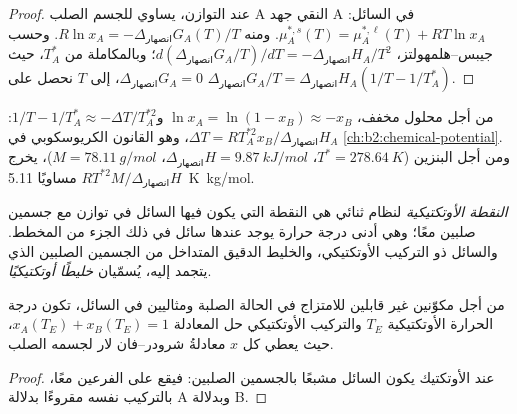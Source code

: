 \begin{proof}
عند التوازن، يساوي  للجسم الصلب A النقي جهد A في
السائل: $\mu_A^{*,s}(T) = \mu_A^{*,\ell}(T) + RT\ln x_A$. ومنه $R\ln x_A =
-\Delta_{\text{انصهار}}G_A(T)/T$. وحسب جيبس--هلمهولتز، $d(\Delta_{\text{انصهار}}G_A/T)/
dT = -\Delta_{\text{انصهار}}H_A/T^2$؛ وبالمكاملة من $T_A^*$، حيث
$\Delta_{\text{انصهار}}G_A = 0$، إلى $T$ نحصل على $\Delta_{\text{انصهار}}G_A/T =
\Delta_{\text{انصهار}}H_A(1/T - 1/T_A^*)$.
\end{proof}

من أجل محلول مخفف، $\ln x_A = \ln(1 - x_B) \approx -x_B$ و$1/T -
1/T_A^* \approx -\Delta T/T_A^{*2}$: $\Delta T = RT_A^{*2}x_B/\Delta_{\text{انصهار}}H_A$،
وهو القانون الكريوسكوبي في \cref{ch:b2:chemical-potential}. ومن أجل البنزين ($T^* =
\qty{278.64}{K}$، $\Delta_{\text{انصهار}}H = \qty{9.87}{kJ/mol}$، $M =
\qty{78.11}{g/mol}$)، يخرج  $RT^{*2}M/\Delta_{\text{انصهار}}H$
مساويًا \qty{5.11}{K.kg/mol}.

\begin{definition}[الأوتكتيك]\label{def:b2:solid-liquid-diagrams:eutectic}
\emph{النقطة الأوتكتيكية} لنظام ثنائي هي
النقطة التي يكون فيها السائل في توازن مع جسمين صلبين معًا؛ وهي
أدنى درجة حرارة يوجد عندها سائل في ذلك الجزء من المخطط. والسائل
ذو التركيب الأوتكتيكي، والخليط الدقيق المتداخل من الجسمين
الصلبين الذي يتجمد إليه، يُسمّيان \emph{خليطًا
أوتكتيكيًا}.
\end{definition}

\begin{corollary}\label{cor:b2:solid-liquid-diagrams:eutectic}
من أجل مكوّنين غير قابلين للامتزاج في الحالة الصلبة ومثاليين في السائل، تكون
درجة الحرارة الأوتكتيكية $T_E$ والتركيب الأوتكتيكي حل المعادلة
$x_A(T_E) + x_B(T_E) = 1$، حيث يعطي كل $x$ معادلةُ شرودر--فان لار
لجسمه الصلب.
\end{corollary}

\begin{proof}
عند الأوتكتيك يكون السائل مشبعًا بالجسمين الصلبين: فيقع على
الفرعين معًا، بالتركيب نفسه مقروءًا بدلالة A وبدلالة B.
\end{proof}


